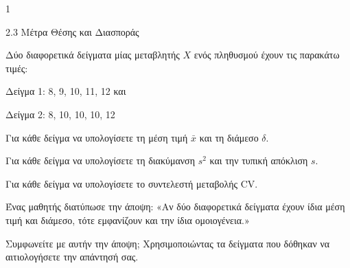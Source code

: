 \begin{ylh}{1}
    \item 2.3 Μέτρα Θέσης και Διασποράς
\end{ylh}
Δύο διαφορετικά δείγματα μίας μεταβλητής $X$ ενός πληθυσμού έχουν τις παρακάτω τιμές:

Δείγμα 1: 8, 9, 10, 11, 12 και

Δείγμα 2: 8, 10, 10, 10, 12

\begin{alist}
    \item Για κάθε δείγμα να υπολογίσετε τη μέση τιμή $\bar{x}$ και τη διάμεσο $\delta$. 
    \item Για κάθε δείγμα να υπολογίσετε τη διακύμανση $s^2$ και την τυπική απόκλιση $s$. 
    \item Για κάθε δείγμα να υπολογίσετε το συντελεστή μεταβολής CV. 
    \item Ένας μαθητής διατύπωσε την άποψη:
    «Αν δύο διαφορετικά δείγματα έχουν ίδια μέση τιμή και διάμεσο, τότε εμφανίζουν και την ίδια ομοιογένεια.»

    Συμφωνείτε με αυτήν την άποψη; Χρησιμοποιώντας τα δείγματα που δόθηκαν να αιτιολογήσετε την απάντησή σας. 
\end{alist}

